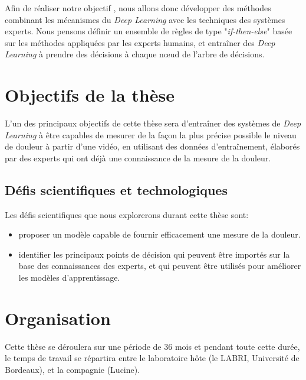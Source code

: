 \documentclass[french]{article}
\begin{document}
Afin de réaliser notre objectif , nous allons donc développer des méthodes
combinant les mécanismes du \emph{Deep Learning} avec les techniques des systèmes
experts. Nous pensons définir un ensemble de règles de type "\emph{if-then-else}" basée
sur les méthodes appliquées par les experts humains, et entraîner des
\emph{Deep Learning} à prendre des décisions à chaque nœud de l’arbre de décisions.


\section{Objectifs de la thèse}
\label{sec:orgf2f9c8d}


L’un des  principaux objectifs de cette  thèse sera d’entraîner des  systèmes de
\emph{Deep Learning}  à être  capables de  mesurer de la  façon la  plus précise
possible le  niveau de douleur  à partir d'une  vidéo, en utilisant  des données
d'entra\^inement, élaborés par  des experts qui ont déjà une  connaissance de la
mesure de la douleur.




\subsection{Défis scientifiques et technologiques}
\label{sec:orgb1aac1c}


Les défis scientifiques que nous explorerons durant cette thèse sont:
\begin{itemize}
\item proposer un modèle capable de fournir efficacement une mesure de la douleur.
\item identifier les principaux points de décision qui peuvent être importés sur la
base des connaissances des experts, et qui peuvent être utilisés pour
améliorer les modèles d’apprentissage.
\end{itemize}

\section{Organisation}
\label{sec:org66b1492}
Cette thèse se déroulera sur une période de 36 mois et pendant toute cette
durée, le temps de travail se répartira entre le laboratoire hôte (le LABRI,
Université de Bordeaux), et la compagnie (Lucine).
\end{document}
